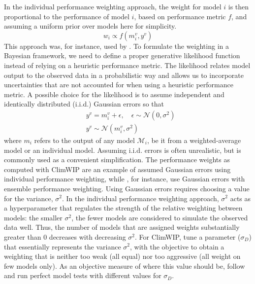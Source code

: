 In the individual performance weighting approach, the weight for model $i$ is then proportional to the performance of model $i$, based on performance metric $f$, and assuming a uniform prior over models here for simplicity.
%
\begin{equation}
	w_i \propto f(m^v_i, y^v)
\end{equation}
This approach was, for instance, used by \citet{sierraInformationtheoreticApproachObtain2025}. %
To formulate the weighting in a Bayesian framework, we need to define a proper generative likelihood function instead of relying on a heuristic performance metric. 
The likelihood relates model output to the observed data in a probabilistic way and allows us to incorporate uncertainties that are not accounted for when using a heuristic performance metric.
A possible choice for the likelihood is to assume independent and identically distributed (i.i.d.) Gaussian errors so that
%
\begin{align}
& y^v = m_i^v + \epsilon, \quad \epsilon \sim \mathcal{N}(0, \sigma^2) \\
& y^v \sim \mathcal{N}(m_i^v, \sigma^2)
\end{align}
%
where $m_i$ refers to the output of any model $\mathcal{M}_i$, be it from a weighted-average model or an individual model. Assuming i.i.d. errors is often unrealistic, but is commonly used as a convenient simplification. The performance weights as computed with ClimWIP \citep{brunnerReducedGlobalWarming2020} are an example of assumed Gaussian errors using individual performance weighting, while \citet{massoudBayesianModelAveraging2020}, for instance, use Gaussian errors with ensemble performance weighting. 
Using Gaussian errors requires choosing a value for the variance, $\sigma^2$.
In the individual performance weighting approach, $\sigma^2$ acts as a hyperparameter that regulates the strength of the relative weighting between models: the smaller $\sigma^2$, the fewer models are considered to simulate the observed data well. Thus, the number of models that are assigned weights substantially greater than 0 decreases with decreasing $\sigma^2$. 
For ClimWIP, \citet{brunnerReducedGlobalWarming2020} tune a parameter ($\sigma_D$) that essentially represents the variance $\sigma^2$, with the objective to obtain a weighting that is neither too weak (all equal) nor too aggressive (all weight on few models only). As an objective measure of where this value should be, \citet{brunnerReducedGlobalWarming2020} follow \citet{knuttiClimateModelProjection2017} and run perfect model tests with different values for $\sigma_D$. 
